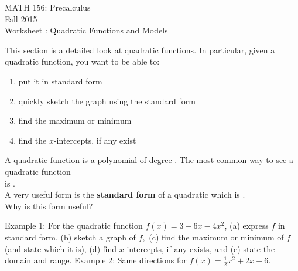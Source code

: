 \documentclass[11pt]{article}
\newcommand{\sect}{\textsection}
\begin{document}
 

\begin{center}MATH 156: Precalculus  \\ Fall 2015 \\ Worksheet \sect 3.1: Quadratic Functions and Models\end{center}

\hrulefill

This section is a detailed look at quadratic functions. In particular, given a quadratic function, you want to be able to:
\begin{enumerate}
\item put it in standard form
\item quickly sketch the graph using the standard form
\item find the maximum or minimum
\item find the $x$-intercepts, if any exist
\end{enumerate}

\hrulefill

A quadratic function is a polynomial of degree \underline{\hspace{.5in}}. The most common way to see a quadratic function\\

 is \underline{\hspace{2in}}.\\

A very useful form is the {\bf{standard form}} of a quadratic which is \underline{\hspace{2in}}.\\

Why is this form useful?

\hrulefill

Example 1: For the quadratic function $f(x)=3-6x-4x^2$, (a) express $f$ in standard form, (b) sketch a graph of $f,$ (c) find the maximum or minimum of $f$ (and state which it is), (d) find $x$-intercepts, if any exists, and (e) state the domain and range.
\newpage
Example 2: Same directions for $f(x)=\frac{1}{2}x^2+2x-6.$
\end{document}
